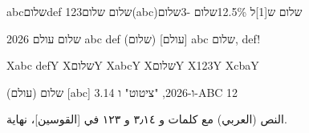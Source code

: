 \documentclass{article}
\begin{document}
abcשלוםdef 123שלום שלום(abc)שלום ש[1]ל 12.5\%שלום -3שלום

שלום עולם 2026 abc def (שלום) [עולם] abc שלום, def!

X‫abc def‬Y X‎שלום‎Y X⁧abc⁩Y X⁦שלום⁩Y X⁨123⁩Y X‮abc‬Y

\begin{hebrew}
שלום (עולם) [abc] 3.14 ו-2026, "ציטוט" ו-ABC 12%
\end{hebrew}

\begin{Arabic}
النص (العربي) مع كلمات و ٣٫١٤ و ١٢٣ في [القوسين]، نهاية.
\end{Arabic}
\end{document}
